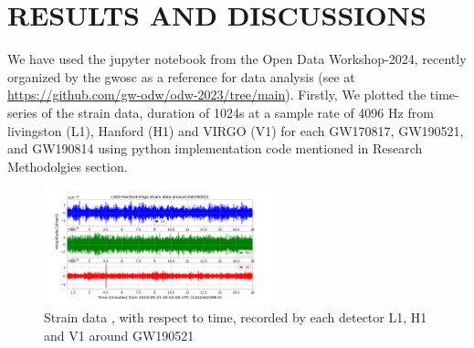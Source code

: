 \chapter{RESULTS AND DISCUSSIONS}
\onehalfspacing

We have used the jupyter notebook from the Open Data Workshop-2024, recently organized by the gwosc as a reference for data analysis (see at \url{https://github.com/gw-odw/odw-2023/tree/main}). Firstly, We plotted the time-series of the strain data, duration of 1024s at a sample rate of 4096 Hz from livingston (L1), Hanford (H1) and VIRGO (V1) for each GW170817, GW190521, and GW190814 using python implementation code mentioned in Research Methodolgies section.

\begin{figure}[h]
            \centering
            \includegraphics[width=0.6\textwidth]{GWanalysisProject_codefile/strainplot/GW190521strain.png}
            \caption{Strain data , with respect to time, recorded by each detector L1, H1 and V1 around GW190521}
            \label{fig:GW190521strain}
\end{figure}

